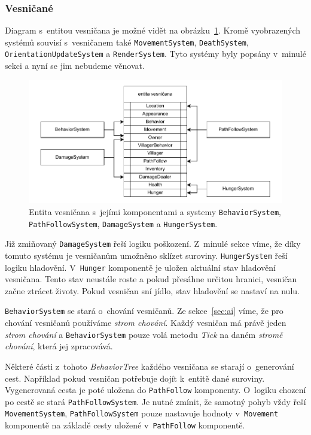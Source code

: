 \subsubsection{Vesničané}
Diagram s~entitou vesničana je možné vidět na obrázku~\ref{fig:villager}. Kromě vyobrazených systémů souvisí s~vesničanem také \texttt{MovementSystem}, \texttt{DeathSystem}, \texttt{OrientationUpdateSystem} a \texttt{RenderSystem}. Tyto systémy byly popsány v~minulé sekci a nyní se jim nebudeme věnovat.

\begin{figure}[!htb]
  \centering
  \includegraphics[width=1.0\linewidth]{img/villager.pdf}
  \caption{Entita vesničana s~jejími komponentami a systemy \texttt{BehaviorSystem}, \texttt{PathFollowSystem}, \texttt{DamageSystem} a \texttt{HungerSystem}.}
  \label{fig:villager}
\end{figure}

Již zmiňovaný \texttt{DamageSystem} řeší logiku poškození. Z~minulé sekce víme, že díky tomuto systému je vesničanům umožněno sklízet suroviny. \texttt{HungerSystem} řeší logiku hladovění. V~\texttt{Hunger} komponentě je uložen aktuální stav hladovění vesničana. Tento stav neustále roste a pokud přesáhne určitou hranici, vesničan začne ztrácet životy. Pokud vesničan sní jídlo, stav hladovění se nastaví na nulu.

\texttt{BehaviorSystem} se stará o~chování vesničanů. Ze sekce~\ref{sec:ai} víme, že pro chování vesničanů používáme \textit{strom chování}. Každý vesničan má právě jeden \textit{strom chování} a \texttt{BehaviorSystem} pouze volá metodu \textit{Tick} na daném \textit{stromě chování}, která jej zpracovává.

Některé části z~tohoto \textit{BehaviorTree} každého vesničana se starají o~generování cest. Například pokud vesničan potřebuje dojít k~entitě dané suroviny. Vygenerovaná cesta je poté uložena do \texttt{PathFollow} komponenty. O~logiku chození po cestě se stará \texttt{PathFollowSystem}. Je nutné zmínit, že samotný pohyb vždy řeší \texttt{MovementSystem}, \texttt{PathFollowSystem} pouze nastavuje hodnoty v~\texttt{Movement} komponentě na základě cesty uložené v~\texttt{PathFollow} komponentě.

